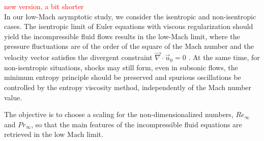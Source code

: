 \documentclass[preprint,10pt]{elsarticle}
\renewcommand{\div}{\vec{\nabla}\! \cdot \!}
\newcommand{\tcr}[1]{\textcolor{red}{#1}}
\begin{document}
\tcr{new version, a bit shorter\\}
In our low-Mach asymptotic study, we consider the isentropic and non-isentropic cases. The isentropic limit of Euler equations with viscous regularization should yield the incompressible fluid flows results in the low-Mach limit, where the pressure fluctuations are of the order of the square of the Mach number and the velocity vector satisfies the divergent constraint $\div \vec{u}_0 = 0$ \cite{LowMach1, LowMach2, LowMach3}. At the same time, for non-isentropic situations, shocks may still form, even in subsonic flows, the minimum entropy principle should be preserved and spurious oscillations be controlled by the entropy viscosity method, independently of the Mach number value.

The objective is to choose a scaling for the non-dimensionalized numbers, $Re_\infty$ and $Pr_\infty$, so that the main features of the incompressible fluid equations are retrieved in the low Mach limit.
\end{document}

